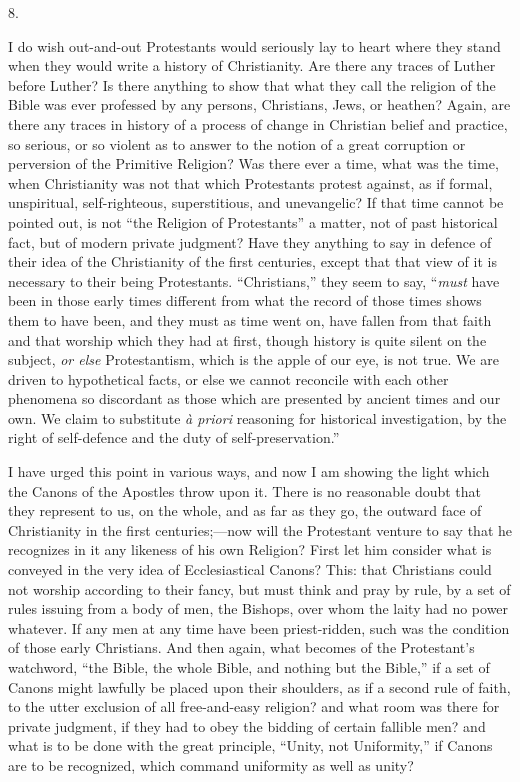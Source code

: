 8.

I do wish out-and-out Protestants would seriously lay to heart
where they stand when they would write a history of Christianity. Are
there any traces of Luther before Luther? Is there anything to show
that what they call the religion of the Bible was ever professed by
any persons, Christians, Jews, or heathen? Again, are there any traces
in history of a process of change in Christian belief and
practice, so serious, or so violent as to answer to the notion of a
great corruption or perversion of the Primitive Religion? Was there
ever a time, what was the time, when Christianity was not that which
Protestants protest against, as if formal, unspiritual,
self-righteous, superstitious, and unevangelic? If that time cannot be
pointed out, is not ``the Religion of Protestants'' a matter,
not of past historical fact, but of modern private judgment? Have they
anything to say in defence of their idea of the Christianity of the
first centuries, except that that view of it is necessary to their
being Protestants. ``Christians,'' they seem to say, ``\emph{must}
have been in those early times different from what the record of those
times shows them to have been, and they must as time went on, have
fallen from that faith and that worship which they had at first,
though history is quite silent on the subject, \emph{or else}
Protestantism, which is the apple of our eye, is not true. We are
driven to hypothetical facts, or else we cannot reconcile with each
other phenomena so discordant as those which are presented by ancient
times and our own. We claim to substitute \emph{à priori} reasoning
for historical investigation, by the right of self-defence and the
duty of self-preservation.''

I have urged this point in various ways, and now I am showing the
light which the Canons of the Apostles throw upon it. There is no
reasonable doubt that they represent to us, on the whole, and as far
as they go, the outward face of Christianity in the first centuries;—now
will the Protestant venture to say that he recognizes in it any
likeness of his own Religion? First let him consider what is conveyed
in the very idea of Ecclesiastical Canons? This: that Christians could
not worship according to their fancy, but must think and pray by
rule, by a set of rules issuing from a body of men, the Bishops, over
whom the laity had no power whatever. If any men at any time have been
priest-ridden, such was the condition of those early Christians. And
then again, what becomes of the Protestant's watchword, ``the
Bible, the whole Bible, and nothing but the Bible,'' if a set of
Canons might lawfully be placed upon their shoulders, as if a second
rule of faith, to the utter exclusion of all free-and-easy religion?
and what room was there for private judgment, if they had to obey the
bidding of certain fallible men? and what is to be done with the great
principle, ``Unity, not Uniformity,'' if Canons are to be
recognized, which command uniformity as well as unity?

